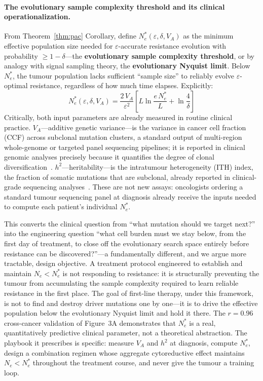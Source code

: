\documentclass[12pt]{article}
\theoremstyle{remark}
\begin{document}
\paragraph{The evolutionary sample complexity threshold and its clinical operationalization.} From Theorem~\ref{thm:pac} Corollary, define $N_e^*(\varepsilon, \delta, V_A)$ as the minimum effective population size needed for $\varepsilon$-accurate resistance evolution with probability $\geq 1-\delta$---the \textbf{evolutionary sample complexity threshold}, or by analogy with signal sampling theory, the \textbf{evolutionary Nyquist limit}. Below $N_e^*$, the tumour population lacks sufficient ``sample size'' to reliably evolve $\varepsilon$-optimal resistance, regardless of how much time elapses. Explicitly:
\[
  N_e^*(\varepsilon, \delta, V_A) = \frac{2\,V_A}{\varepsilon^2}\!\left[L\ln\frac{e\,N_e^*}{L} + \ln\frac{4}{\delta}\right]
\]
Critically, both input parameters are already measured in routine clinical practice. $V_A$---additive genetic variance---is the variance in cancer cell fraction (CCF) across subclonal mutation clusters, a standard output of multi-region whole-genome or targeted panel sequencing pipelines; it is reported in clinical genomic analyses precisely because it quantifies the degree of clonal diversification~\cite{dentro2021}. $h^2$---heritability---is the intratumour heterogeneity (ITH) index, the fraction of somatic mutations that are subclonal, already reported in clinical-grade sequencing analyses~\cite{jamal2023,abbosh2023}. These are not new assays: oncologists ordering a standard tumour sequencing panel at diagnosis already receive the inputs needed to compute each patient's individual $N_e^*$.

This converts the clinical question from ``what mutation should we target next?'' into the engineering question ``what cell burden must we stay below, from the first day of treatment, to close off the evolutionary search space entirely before resistance can be discovered?''---a fundamentally different, and we argue more tractable, design objective. A treatment protocol engineered to establish and maintain $N_e < N_e^*$ is not responding to resistance: it is structurally preventing the tumour from accumulating the sample complexity required to learn reliable resistance in the first place. The goal of first-line therapy, under this framework, is not to find and destroy driver mutations one by one---it is to drive the effective population below the evolutionary Nyquist limit and hold it there. The $r = 0.96$ cross-cancer validation of Figure~3A demonstrates that $N_e^*$ is a real, quantitatively predictive clinical parameter, not a theoretical abstraction. The playbook it prescribes is specific: measure $V_A$ and $h^2$ at diagnosis, compute $N_e^*$, design a combination regimen whose aggregate cytoreductive effect maintains $N_e < N_e^*$ throughout the treatment course, and never give the tumour a training loop.
\end{document}
